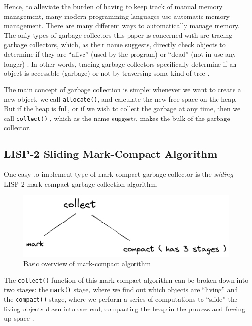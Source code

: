 \documentclass[index]{subfiles}
\begin{document}
Hence, to alleviate the burden of having to keep track of manual memory management, many modern programming languages use automatic memory management. There are many different ways to automatically manage memory. The only types of garbage collectors this paper is concerned with are tracing garbage collectors, which, as their name suggests, directly check objects to determine if they are ``alive'' (used by the program) or ``dead'' (not in use any longer) \cite{a_unified_theory_of_garbage_collection}. In other words, tracing garbage collectors specifically determine if an object is accessible (garbage) or not by traversing some kind of tree \cite[Chapter~1]{gc_handbook}.

The main concept of garbage collection is simple: whenever we want to create a new object, we call \verb+allocate()+, and calculate the new free space on the heap. But if the heap is full, or if we wish to collect the garbage at any time, then we call \verb+collect()+ \cite{gc_handbook}, which as the name suggests, makes the bulk of the garbage collector.

\subsection{LISP-2 Sliding Mark-Compact Algorithm}

One easy to implement type of mark-compact garbage collector is the \textit{sliding} LISP 2 mark-compact garbage collection algorithm.

\begin{figure}[H]
    \centering
    \includegraphics[scale=0.3]{pics/mark-compact-overview.png}
    \caption{Basic overview of mark-compact algorithm}
\end{figure}

The \verb+collect()+ function of this mark-compact algorithm can be broken down into two stages: the \verb+mark()+ stage, where we find out which objects are ``living'' and the \verb+compact()+ stage, where we perform a series of computations to ``slide'' the living objects down into one end, compacting the heap in the process and freeing up space \cite[Chapter~3]{gc_handbook}.
\end{document}
